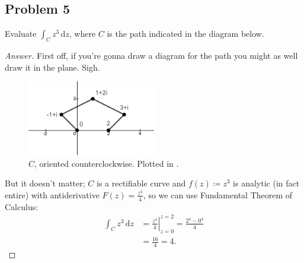 \documentclass[12pt]{article}
\newcommand{\ds}{\displaystyle}
\theoremstyle{definition}
\begin{document}
\subsection{Problem 5}
Evaluate $\ds \int_C z^3 \, \mathrm{d}z$, where $C$ is the path indicated in the diagram below.
\begin{center}
\end{center}
\begin{proof}[Answer]
    First off, if you're gonna draw a diagram for the path you might as well draw it in the plane. Sigh.
    \begin{figure}[H]
        \centering
        \includegraphics[width = 0.5\textwidth]{9.png}
        \caption{$C$, oriented counterclockwise. Plotted in \cite{Desmos}.}
        \label{fig:fig9}
    \end{figure}
    But it doesn't matter; $C$ is a rectifiable curve and $f(z) \coloneqq z^3$ is analytic (in fact entire) with antiderivative $F(z) = \frac{z^4}{4}$, so we can use Fundamental Theorem of Calculus:
    \begin{align*}
        \int_C z^3 \, \mathrm{d}z & = \left. \frac{z^4}{4} \right|_{z = 0}^{z = 2} = \frac{2^4 - 0^4}{4} \\
        & = \frac{16}{4} = \boxed{4.}
    \end{align*}
\end{proof}
\end{document}
